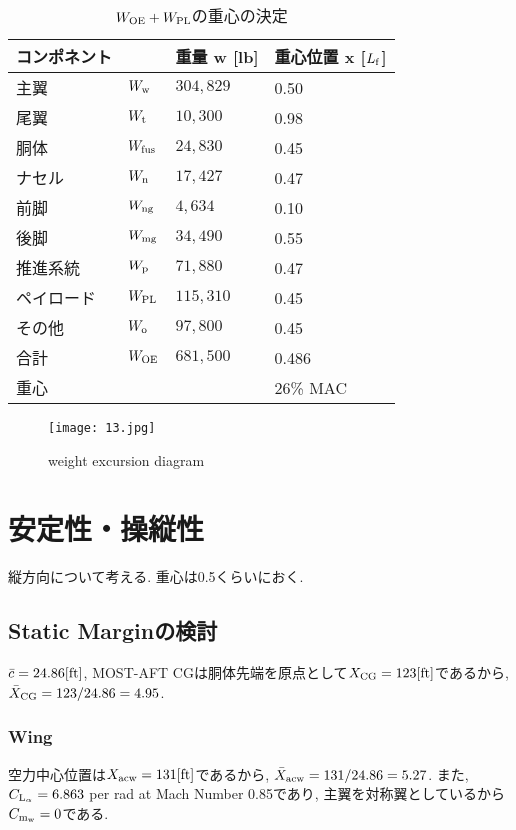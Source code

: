 \documentclass[12pt]{jsarticle}
\begin{document}
\begin{table}[H]
	\caption{$W_{\rm OE} + W_{\rm PL}$の重心の決定}
	\begin{center}
		\begin{tabular}{p{2cm} p{2cm} p{3cm} p{3cm}} \hline
			 コンポネント  & & 重量 w [lb] & 重心位置 x [$L_{\rm f}$] \\ \hline \hline
			主翼 & $W_{\rm w}$ & $304,829$ & 0.50 \\
			尾翼 & $W_{\rm t}$ & $10,300$ & 0.98 \\
			胴体 & $W_{\rm fus}$ & $24,830$ & 0.45 \\
			ナセル & $W_{\rm n}$ & $17,427$ & 0.47 \\
			前脚 & $W_{\rm ng}$ & $4,634$ & 0.10 \\
			後脚 & $W_{\rm mg}$ & $34,490$ & 0.55 \\
			推進系統 & $W_{\rm p}$ & $71,880$ & 0.47 \\
			ペイロード & $W_{\rm PL}$ & $115,310$ & 0.45 \\
			その他 & $W_{\rm o}$ & $97,800$ & 0.45 \\ \hline
			合計 & $W_{\rm OE}$ & $681,500$ & 0.486 \\ \hline \hline
			重心 & & & 26\% MAC \\ \hline
		\end{tabular}
	\end{center}
\end{table}

\begin{figure}[H]
\begin{center}
\texttt{[image: 13.jpg]}
\caption{weight excursion diagram}
\end{center}
\end{figure}

\section{安定性・操縦性}
縦方向について考える. 重心は0.5くらいにおく.

\subsection{Static Marginの検討}
$\bar{c} = 24.86[\rm ft]$, MOST-AFT CGは胴体先端を原点として$X_{\rm CG} = 123[\rm ft]$であるから, $\bar{X}_{\rm CG} = 123/24.86 = 4.95$.

\subsubsection*{Wing}
空力中心位置は$X_{\rm acw} = 131[\rm ft]$であるから, $\bar{X}_{\rm acw} = 131/24.86 = 5.27$. また, $C_{\rm L_{\alpha}} = 6.863$ per rad at Mach Number 0.85であり, 主翼を対称翼としているから$C_{\rm m_{w}} = 0$である.
\end{document}
